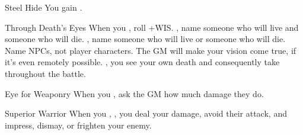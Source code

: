 \documentclass[8pt]{extarticle}
\begin{document}
\begin{multicols}{2}
\begin{amove}{Steel Hide}
  You gain .
\end{amove}

\begin{amove}{Through Death’s Eyes}
  When you , roll +WIS. \onSuccess, name
  someone who will live and someone who will die. \onPartial, name
  someone who will live or someone who will die. Name NPCs, not player
  characters. The GM will make your vision come true, if it’s even
  remotely possible. \onMiss, you see your own death and consequently
  take  throughout the battle.
\end{amove}

\begin{amove}{Eye for Weaponry}
  When you , ask the GM how
  much damage they do.
\end{amove}

\begin{amove}{Superior Warrior}
  When you , \onMassiveSuccess, you deal your
  damage, avoid their attack, and impress, dismay, or frighten your
  enemy.
\end{amove}


\vfill\null
\end{multicols}
\end{document}
